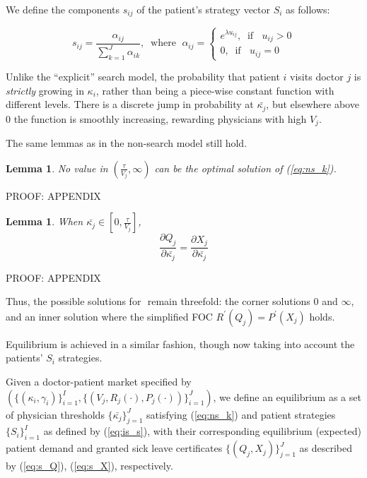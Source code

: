 \documentclass{article}
\newtheorem{lemma}[theorem]{Lemma}
\begin{document}
We define the components $s_{ij}$ of the patient's strategy vector $S_i$ as follows:

\begin{equation}
s_{ij} = \frac{\alpha_{ij}}{\sum_{k = 1}^{J} \alpha_{ik}}, \; \; \text{where } \; \alpha_{ij} = \begin{cases}
e^{\lambda u_{ij}}, \; \; \text{if } \; \; u_{ij} > 0 \\
0 , \; \; \text{if } \; \; u_{ij} = 0
\end{cases}
\label{eq:is_s}
\tag{S}
\end{equation}

Unlike the ``explicit'' search model, the probability that patient $i$ visits doctor $j$ is \textit{strictly} growing in $\kappa_i$, rather than being a piece-wise constant function with different levels. There is a discrete jump in probability at $\bar{\kappa_j}$, but elsewhere above $0$ the function is smoothly increasing, rewarding physicians with high $V_j$.

The same lemmas as in the non-search model still hold.


\begin{lemma}
\label{is_lemma}
No value in $(\frac{\tau}{V_j},\infty)$ can be the optimal solution of (\ref{eq:ns_k}).
\end{lemma}
    
    PROOF: APPENDIX
    
\begin{lemma}
\label{is_derivatives}
When $\bar{\kappa_j} \in [0,\frac{\tau}{V_j}]$,
\[
\frac{\partial Q_j}{\partial\bar{\kappa_j}} = \frac{\partial X_j}{\partial \bar{\kappa_j}}   
\]
\end{lemma}
    
PROOF: APPENDIX

Thus, the possible solutions for $\label{eq:ns_k}$ remain threefold: the corner solutions $0$ and $\infty$, and an inner solution where the simplified FOC $R^{\prime}(Q_j) = P^{\prime}(X_j)$ holds.

Equilibrium is achieved in a similar fashion, though now taking into account the patients' $S_i$ strategies.

\begin{equilibrium}
    \label{is_eq}
Given a doctor-patient market specified by $(\{(\kappa_i,\gamma_i)\}_{i =1}^{I},\{(V_j,R_j(\cdot),P_j(\cdot))\}_{i =1}^{J})$, we define an equilibrium as a set of physician thresholds $\{\bar{\kappa_j}\}_{j =1}^{J}$ satisfying (\ref{eq:ns_k}) and patient strategies $\{S_i\}_{i =1}^{I}$ as defined by (\ref{eq:is_s}), with their corresponding equilibrium (expected) patient demand and granted sick leave certificates $\{(Q_j,X_j)\}_{j =1}^{J}$ as described by (\ref{eq:s_Q}), (\ref{eq:s_X}), respectively.
\end{equilibrium}
\end{document}
